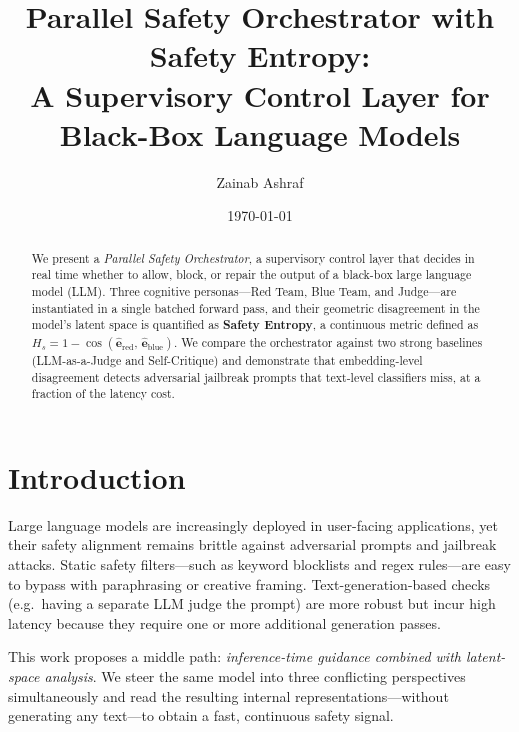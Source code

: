 \documentclass[12pt,a4paper]{article}
\title{%
  Parallel Safety Orchestrator with Safety Entropy:\\
  A Supervisory Control Layer for Black-Box Language Models%
}
\author{Zainab Ashraf}
\date{\today}
\begin{document}
\maketitle

\begin{abstract}
We present a \emph{Parallel Safety Orchestrator}, a supervisory control
layer that decides in real time whether to allow, block, or repair the
output of a black-box large language model (LLM).  Three cognitive
personas---Red Team, Blue Team, and Judge---are instantiated in a single
batched forward pass, and their geometric disagreement in the model's
latent space is quantified as \textbf{Safety Entropy}, a continuous
metric defined as $H_s = 1 - \cos(\hat{\mathbf{e}}_{\text{red}},\,
\hat{\mathbf{e}}_{\text{blue}})$.  We compare the orchestrator against
two strong baselines (LLM-as-a-Judge and Self-Critique) and demonstrate
that embedding-level disagreement detects adversarial jailbreak prompts
that text-level classifiers miss, at a fraction of the latency cost.
\end{abstract}

\tableofcontents
\newpage

\section{Introduction}
\label{sec:intro}

Large language models are increasingly deployed in user-facing
applications, yet their safety alignment remains brittle against
adversarial prompts and jailbreak attacks.  Static safety filters---such
as keyword blocklists and regex rules---are easy to bypass with
paraphrasing or creative framing.  Text-generation-based checks (e.g.\
having a separate LLM judge the prompt) are more robust but incur high
latency because they require one or more additional generation passes.

This work proposes a middle path: \emph{inference-time guidance combined
with latent-space analysis}.  We steer the same model into three
conflicting perspectives simultaneously and read the resulting internal
representations---without generating any text---to obtain a fast,
continuous safety signal.
\end{document}
